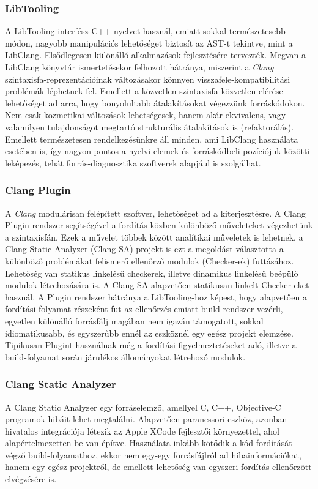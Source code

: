 \documentclass[a4paper,12pt]{report}
\begin{document}
\subsubsection{LibTooling}
A LibTooling interfész C++ nyelvet használ, emiatt sokkal természetesebb módon, nagyobb manipulációs lehetőséget biztosít az AST-t tekintve, mint a LibClang. Elsődlegesen különálló alkalmazások fejlesztésére tervezték. Megvan a LibClang könyvtár ismertetésekor felhozott hátránya, miszerint a \emph{Clang} szintaxisfa-reprezentációinak változásakor könnyen visszafele-kompatibilitási problémák léphetnek fel. Emellett a közvetlen szintaxisfa közvetlen elérése lehetőséget ad arra, hogy bonyolultabb átalakításokat végezzünk forráskódokon. Nem csak kozmetikai változások lehetségesek, hanem akár ekvivalens, vagy valamilyen tulajdonságot megtartó strukturális átalakítások is (refaktorálás). Emellett természetesen rendelkezésünkre áll minden, ami LibClang használata esetében is, így nagyon pontos a nyelvi elemek és forráskódbeli pozíciójuk közötti leképezés, tehát forrás-diagnosztika szoftverek alapjául is szolgálhat.

\subsubsection{Clang Plugin}
A \emph{Clang} modulárisan felépített szoftver, lehetőséget ad a kiterjesztésre. A Clang Plugin rendszer segítségével a fordítás közben különböző műveleteket végezhetünk a szintaxisfán. Ezek a művelet többek között analítikai műveletek is lehetnek, a Clang Static Analyzer (Clang SA) projekt is ezt a megoldást választotta a különböző problémákat felismerő ellenőrző modulok (Checker-ek) futtásához. Lehetőség van statikus linkelésű checkerek, illetve dinamikus linkelésű beépülő modulok létrehozására is. A Clang SA alapvetően statikusan linkelt Checker-eket használ. A Plugin rendszer hátránya a LibTooling-hoz képest, hogy alapvetően a fordítási folyamat részeként fut az ellenőrzés emiatt build-rendszer vezérli, egyetlen különálló forrásfálj magában nem igazán támogatott, sokkal idiomatikusabb, és egyszerűbb ennél az eszköznél egy egész projekt elemzése. Tipikusan Plugint használnak még a fordítási figyelmeztetéseket adó, illetve a build-folyamat során járulékos állományokat létrehozó modulok.

\subsubsection{Clang Static Analyzer}
A Clang Static Analyzer egy forráselemző, amellyel C, C++, Objective-C programok hibáit lehet megtalálni. Alapvetően parancssori eszköz, azonban hivatalos integrációja létezik az Apple XCode fejlesztői környezettel, ahol alapértelmezetten be van építve. Használata inkább kötődik a kód fordítását végző build-folyamathoz, ekkor nem egy-egy forrásfájlról ad hibainformációkat, hanem egy egész projektről, de emellett lehetőség van egyszeri fordítás ellenőrzött elvégzésére is.
\end{document}
